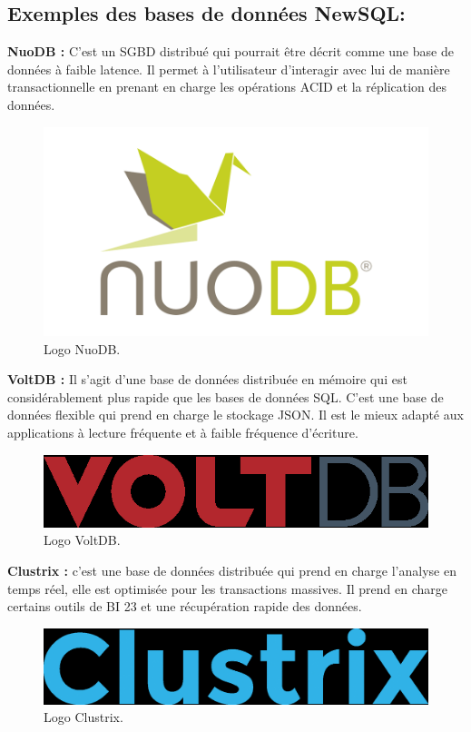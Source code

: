 \subsection{Exemples des bases de données NewSQL:}
\textbf{NuoDB :} C'est un SGBD distribué qui pourrait être décrit comme une base de données à faible latence. Il permet à l'utilisateur d'interagir avec lui de manière transactionnelle en prenant en charge les opérations ACID et la réplication des données. 

\begin{figure}[h]
	\centering
    \includegraphics[scale=0.2]{img/part1/4.15}
    \caption{Logo NuoDB.}
\end{figure}


\textbf{VoltDB :} Il s'agit d'une base de données distribuée en mémoire qui est considérablement plus rapide que les bases de données SQL. C’est une base de données flexible qui prend en charge le stockage JSON. Il est le mieux adapté aux applications à lecture fréquente et à faible fréquence d'écriture.

\begin{figure}[h]
	\centering
    \includegraphics[scale=0.2]{img/part1/4.16}
    \caption{Logo VoltDB.}
\end{figure}

\textbf{Clustrix :} c'est une base de données distribuée qui prend en charge l'analyse en temps réel, elle est optimisée pour les transactions massives. Il prend en charge certains outils de BI 23 et une récupération rapide des données.

\begin{figure}[h]
	\centering
    \includegraphics[scale=0.1]{img/part1/4.17}
    \caption{Logo Clustrix.}
\end{figure}





